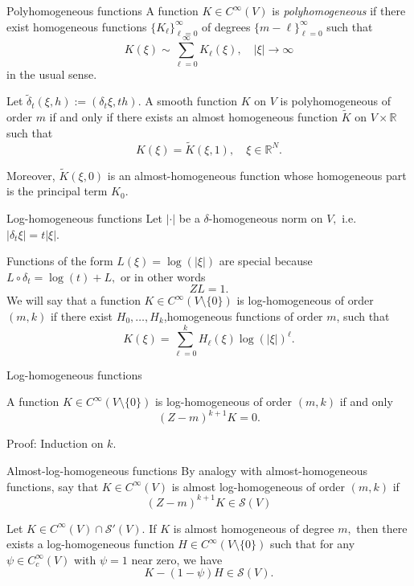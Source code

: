 \documentclass{beamer}
\numberwithin{equation}{section}
\theoremstyle{plain}
\theoremstyle{plain}
\theoremstyle{definition}
\theoremstyle{plain}
\theoremstyle{plain}
\theoremstyle{definition}
\newcommand{\Rl}{\mathbb{R}}
\newcommand{\Sc}{\mathcal{S}}
\begin{document}
\begin{frame}{Polyhomogeneous functions}
    A function $K\in C^{\infty}(V)$ is \emph{polyhomogeneous} if there exist homogeneous functions $\{K_{\ell}\}_{\ell=0}^\infty$ of degrees $\{m-\ell\}_{\ell=0}^\infty$ such that
    \[
        K(\xi)\sim\sum_{\ell=0}^\infty K_{\ell}(\xi),\quad |\xi|\to\infty
    \]
    in the usual sense.
    \begin{theorem}
        Let $\widetilde{\delta}_t(\xi,h) := (\delta_t\xi,th).$ A smooth function $K$ on $V$ is polyhomogeneous of order $m$ if and only if there exists an almost homogeneous function $\widetilde{K}$ on $V\times \Rl$ such that
        \[
            K(\xi) = \widetilde{K}(\xi,1),\quad\xi\in \Rl^N.
        \]
    \end{theorem}
    Moreover, $\widetilde{K}(\xi,0)$ is an almost-homogeneous function whose homogeneous part is the principal term $K_0.$
\end{frame}

\begin{frame}{Log-homogeneous functions}
    Let $|\cdot|$ be a $\delta$-homogeneous norm on $V,$ i.e. $|\delta_t\xi| = t|\xi|.$

    Functions of the form $L(\xi) = \log(|\xi|)$ are special because $L\circ\delta_t = \log(t)+L,$ or in other words
    \[
        ZL = 1.
    \]
    \pause
    We will say that a function $K\in C^{\infty}(V\setminus \{0\})$ is log-homogeneous of order $(m,k)$ if there exist $H_0,\ldots,H_{k}$,homogeneous functions of order $m$, such that
    \[
        K(\xi) = \sum_{\ell=0}^k H_{\ell}(\xi)\log(|\xi|)^\ell.
    \]
\end{frame}

\begin{frame}{Log-homogeneous functions}
\begin{lemma}
    A function $K\in C^{\infty}(V\setminus\{0\})$ is log-homogeneous of order $(m,k)$ if and only
    \[
        (Z-m)^{k+1}K = 0.
    \]
\end{lemma}
Proof: Induction on $k.$
\end{frame}

\begin{frame}{Almost-log-homogeneous functions}
    By analogy with almost-homogeneous functions, say that $K\in C^\infty(V)$ is almost log-homogeneous of order $(m,k)$ if
    \[
        (Z-m)^{k+1}K \in \Sc(V)
    \]
    \begin{lemma}
        Let $K\in C^{\infty}(V)\cap \Sc'(V).$ If $K$ is almost homogeneous of degree $m,$ then there exists a log-homogeneous function $H\in C^{\infty}(V\setminus \{0\})$  such that for any $\psi\in C^\infty_c(V)$ with $\psi=1$ near zero, we have
        \[
            K-(1-\psi)H \in \Sc(V).
        \]
    \end{lemma}
\end{frame}
\end{document}
